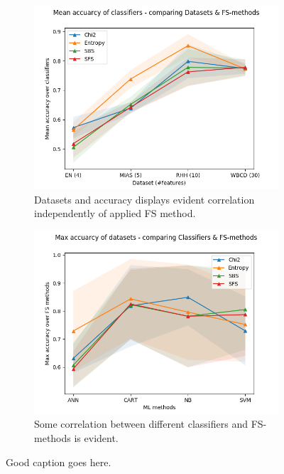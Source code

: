 \begin{figure}[ht]
  \centering
    \begin{subfigure}[b]{0.475\textwidth}
        \centering
        \includegraphics[width=\textwidth]{../plots_with_std_fill/comp_acc_datasets.png}
        \caption[]%
        {{\small Datasets and accuracy displays evident correlation independently of applied FS method.}}
        \label{fig:comp_acc_datasets}
    \end{subfigure}
  \hfill
    \begin{subfigure}[b]{0.475\textwidth}
        \centering
        \includegraphics[width=\textwidth]{../plots_with_std_fill/comp_classif_datasets.png}
        \caption[]%
        {{\small Some correlation between different classifiers and FS-methods is evident.}}
        \label{fig:comp_classif_datasets}
    \end{subfigure}
  \caption[]
  {\small Good caption goes here.}
  \label{fig:anova_plots}
\end{figure}
